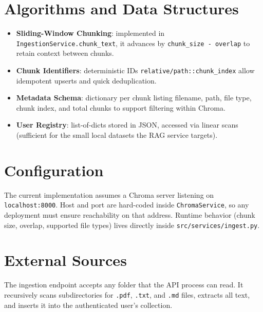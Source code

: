\documentclass[11pt]{article}
\begin{document}
\section{Algorithms and Data Structures}
\begin{itemize}[leftmargin=*]
  \item \textbf{Sliding-Window Chunking}: implemented in \texttt{IngestionService.chunk\_text}, it advances by \texttt{chunk\_size - overlap} to retain context between chunks.
  \item \textbf{Chunk Identifiers}: deterministic IDs \texttt{relative/path::chunk\_index} allow idempotent upserts and quick deduplication.
  \item \textbf{Metadata Schema}: dictionary per chunk listing filename, path, file type, chunk index, and total chunks to support filtering within Chroma.
  \item \textbf{User Registry}: list-of-dicts stored in JSON, accessed via linear scans (sufficient for the small local datasets the RAG service targets).
\end{itemize}

\section{Configuration}
The current implementation assumes a Chroma server listening on \texttt{localhost:8000}. Host and port are hard-coded inside \texttt{ChromaService}, so any deployment must ensure reachability on that address. Runtime behavior (chunk size, overlap, supported file types) lives directly inside \texttt{src/services/ingest.py}.

\section{External Sources}
The ingestion endpoint accepts any folder that the API process can read. It recursively scans subdirectories for \texttt{.pdf}, \texttt{.txt}, and \texttt{.md} files, extracts all text, and inserts it into the authenticated user's collection.
\end{document}
